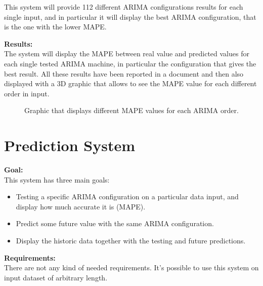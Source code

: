 This system will provide 112 different ARIMA configurations results for each single input, and in particular it will display the best ARIMA configuration, that is the one with the lower MAPE.

\textbf{Results:}\\
The system will display the MAPE between real value and predicted values for each single tested ARIMA machine, in particular the configuration that gives the best result.
All these results have been reported in a document and then also displayed with a 3D graphic that allows to see the MAPE value for each different order in input.

\begin{figure}[H]
	\raggedleft
    \caption{Graphic that displays different MAPE values for each ARIMA order.}
\end{figure}

 
 
\newpage
\section{Prediction System}
\textbf{Goal:}\\ 
This system has three main goals:
\vspace{-5mm}
\begin{itemize}
 \setlength{\itemsep}{-5pt} 
\item Testing a specific ARIMA configuration on a particular data input, and display how much accurate it is (MAPE).
\item Predict some future value with the same ARIMA configuration.
\item Display the historic data together with the testing and future predictions.
\end{itemize}

\textbf{Requirements:}\\
There are not any kind of needed requirements. It's possible to use this system on input dataset of arbitrary length.


